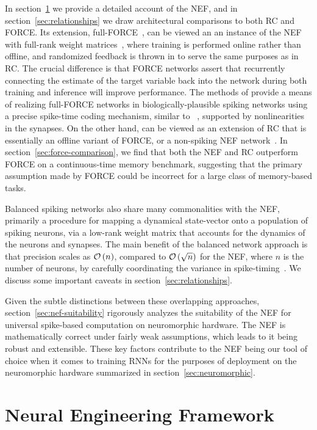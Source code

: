 In section~\ref{sec:nef} we provide a detailed account of the NEF, and in section~\ref{sec:relationships} we draw architectural comparisons to both RC and FORCE.
Its extension, full-FORCE~\citep{depasquale2018full}, can be viewed an an instance of the NEF with full-rank weight matrices~\citep{tripp2006neural}, where training is performed online rather than offline, and randomized feedback is thrown in to serve the same purposes as in RC.
The crucial difference is that FORCE networks assert that recurrently connecting the estimate of the target variable back into the network during both training and inference will improve performance. 
The methods of \citet{thalmeier2016learning} provide a means of realizing full-FORCE networks in biologically-plausible spiking networks using a precise spike-time coding mechanism, similar to ~\citet{boerlin2013predictive}, supported by nonlinearities in the synapses.
On the other hand, \citet{jaeger2014controlling} can be viewed as an extension of RC that is essentially an offline variant of FORCE, or a non-spiking NEF network~\citep{aubin2017}.
In section~\ref{sec:force-comparison}, we find that both the NEF and RC outperform FORCE on a continuous-time memory benchmark, suggesting that the primary assumption made by FORCE could be incorrect for a large class of memory-based tasks.

Balanced spiking networks also share many commonalities with the NEF, primarily a procedure for mapping a dynamical state-vector onto a population of spiking neurons, via a low-rank weight matrix that accounts for the dynamics of the neurons and synapses.
The main benefit of the balanced network approach is that precision scales as $\mathcal{O}\left({n}\right)$, compared to $\mathcal{O}\left({\sqrt{n}}\right)$ for the NEF, where $n$ is the number of neurons, by carefully coordinating the variance in spike-timing~\citep[][Figure~11]{boahen2017neuromorph}.
We discuss some important caveats in section~\ref{sec:relationships}.

Given the subtle distinctions between these overlapping approaches,
section~\ref{sec:nef-suitability} rigorously analyzes the suitability of the NEF for universal spike-based computation on neuromorphic hardware.
The NEF is mathematically correct under fairly weak assumptions, which leads to it being robust and extensible.
These key factors contribute to the NEF being our tool of choice when it comes to training RNNs for the purposes of deployment on the neuromorphic hardware summarized in section~\ref{sec:neuromorphic}.

\section{Neural Engineering Framework}
\label{sec:nef}

